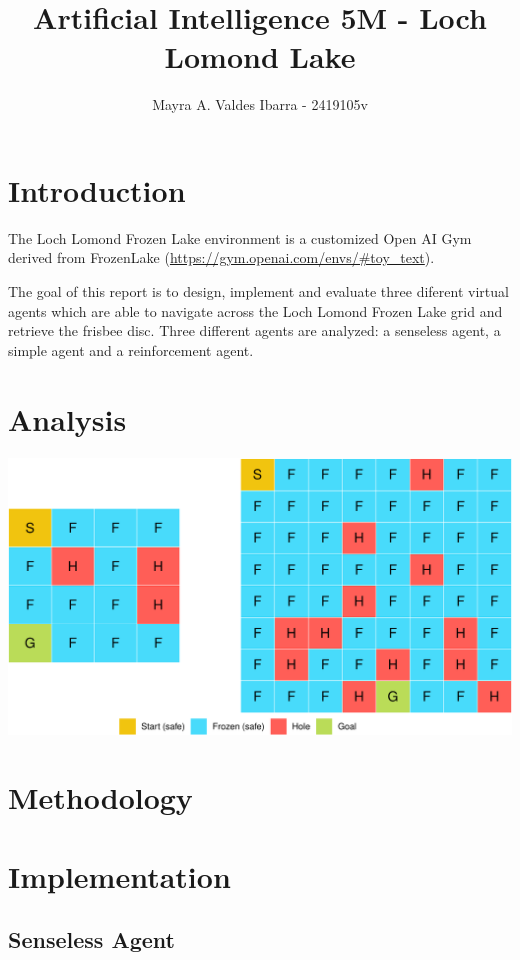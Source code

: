 \documentclass[11pt,]{article}
\title{Artificial Intelligence 5M - Loch Lomond Lake}
\author{Mayra A. Valdes Ibarra - 2419105v}
\date{}
\begin{document}
\maketitle

\section{Introduction}\label{introduction}

The Loch Lomond Frozen Lake environment is a customized Open AI Gym
derived from FrozenLake (\url{https://gym.openai.com/envs/\#toy_text}).

The goal of this report is to design, implement and evaluate three
diferent virtual agents which are able to navigate across the Loch
Lomond Frozen Lake grid and retrieve the frisbee disc. Three different
agents are analyzed: a senseless agent, a simple agent and a
reinforcement agent.

\section{Analysis}\label{analysis}

\begin{center}\includegraphics[width=0.7\linewidth]{project_files/figure-latex/environments-1} \end{center}

\section{Methodology}\label{methodology}

\section{Implementation}\label{implementation}

\subsection{Senseless Agent}\label{senseless-agent}
\end{document}

